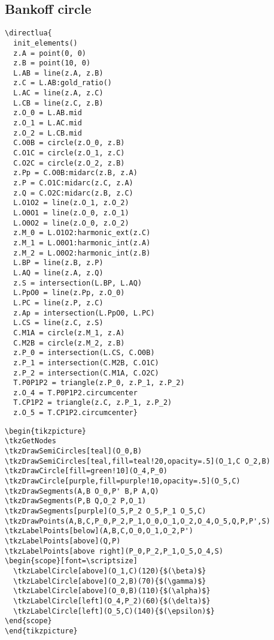 \subsection{Bankoff circle}
\label{sub:bankoff_circle}
\begin{verbatim}
\directlua{
  init_elements()
  z.A = point(0, 0)
  z.B = point(10, 0)
  L.AB = line(z.A, z.B)
  z.C = L.AB:gold_ratio()
  L.AC = line(z.A, z.C)
  L.CB = line(z.C, z.B)
  z.O_0 = L.AB.mid
  z.O_1 = L.AC.mid
  z.O_2 = L.CB.mid
  C.O0B = circle(z.O_0, z.B)
  C.O1C = circle(z.O_1, z.C)
  C.O2C = circle(z.O_2, z.B)
  z.Pp = C.O0B:midarc(z.B, z.A)
  z.P = C.O1C:midarc(z.C, z.A)
  z.Q = C.O2C:midarc(z.B, z.C)
  L.O1O2 = line(z.O_1, z.O_2)
  L.O0O1 = line(z.O_0, z.O_1)
  L.O0O2 = line(z.O_0, z.O_2)
  z.M_0 = L.O1O2:harmonic_ext(z.C)
  z.M_1 = L.O0O1:harmonic_int(z.A)
  z.M_2 = L.O0O2:harmonic_int(z.B)
  L.BP = line(z.B, z.P)
  L.AQ = line(z.A, z.Q)
  z.S = intersection(L.BP, L.AQ)
  L.PpO0 = line(z.Pp, z.O_0)
  L.PC = line(z.P, z.C)
  z.Ap = intersection(L.PpO0, L.PC)
  L.CS = line(z.C, z.S)
  C.M1A = circle(z.M_1, z.A)
  C.M2B = circle(z.M_2, z.B)
  z.P_0 = intersection(L.CS, C.O0B)
  z.P_1 = intersection(C.M2B, C.O1C)
  z.P_2 = intersection(C.M1A, C.O2C)
  T.P0P1P2 = triangle(z.P_0, z.P_1, z.P_2)
  z.O_4 = T.P0P1P2.circumcenter
  T.CP1P2 = triangle(z.C, z.P_1, z.P_2)
  z.O_5 = T.CP1P2.circumcenter}
\end{verbatim}

\begin{verbatim}
\begin{tikzpicture}
\tkzGetNodes
\tkzDrawSemiCircles[teal](O_0,B)
\tkzDrawSemiCircles[teal,fill=teal!20,opacity=.5](O_1,C O_2,B)
\tkzDrawCircle[fill=green!10](O_4,P_0)
\tkzDrawCircle[purple,fill=purple!10,opacity=.5](O_5,C)
\tkzDrawSegments(A,B O_0,P' B,P A,Q)
\tkzDrawSegments(P,B Q,O_2 P,O_1)
\tkzDrawSegments[purple](O_5,P_2 O_5,P_1 O_5,C)
\tkzDrawPoints(A,B,C,P_0,P_2,P_1,O_0,O_1,O_2,O_4,O_5,Q,P,P',S)
\tkzLabelPoints[below](A,B,C,O_0,O_1,O_2,P')
\tkzLabelPoints[above](Q,P)
\tkzLabelPoints[above right](P_0,P_2,P_1,O_5,O_4,S)
\begin{scope}[font=\scriptsize]
  \tkzLabelCircle[above](O_1,C)(120){$(\beta)$}
  \tkzLabelCircle[above](O_2,B)(70){$(\gamma)$}
  \tkzLabelCircle[above](O_0,B)(110){$(\alpha)$}
  \tkzLabelCircle[left](O_4,P_2)(60){$(\delta)$}
  \tkzLabelCircle[left](O_5,C)(140){$(\epsilon)$}
\end{scope}
\end{tikzpicture}
\end{verbatim}


